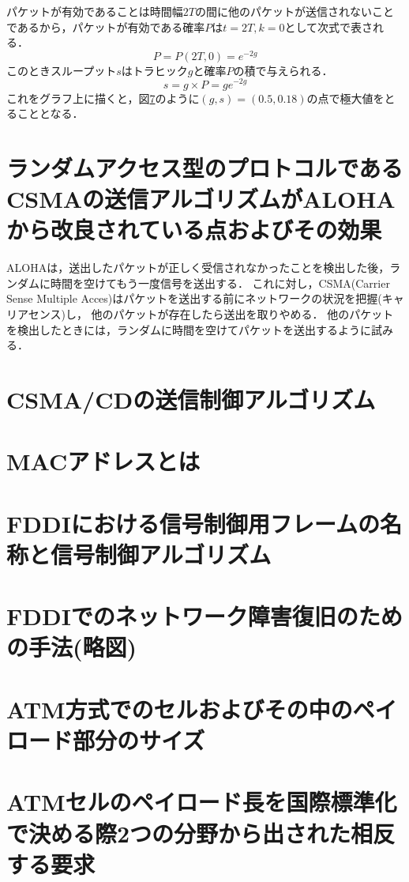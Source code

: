 \documentclass[10.5pt]{jsarticle}
\begin{document}
パケットが有効であることは時間幅$2T$の間に他のパケットが送信されないことであるから，パケットが有効である確率$P$は$t=2T, k=0$として次式で表される．
\[P = P(2T, 0) = e^{-2g}\]
このときスループット$s$はトラヒック$g$と確率$P$の積で与えられる．
\[s = g \times P = ge^{-2g}\]
これをグラフ上に描くと，図\ref{}のように$(g, s) = (0.5, 0.18)$の点で極大値をとることとなる．

\section{ランダムアクセス型のプロトコルであるCSMAの送信アルゴリズムがALOHAから改良されている点およびその効果}
ALOHAは，送出したパケットが正しく受信されなかったことを検出した後，ランダムに時間を空けてもう一度信号を送出する．
これに対し，CSMA(Carrier Sense Multiple Acces)はパケットを送出する前にネットワークの状況を把握(キャリアセンス)し，
他のパケットが存在したら送出を取りやめる．
他のパケットを検出したときには，ランダムに時間を空けてパケットを送出するように試みる．

\section{CSMA/CDの送信制御アルゴリズム}



\section{MACアドレスとは}



\section{FDDIにおける信号制御用フレームの名称と信号制御アルゴリズム}



\section{FDDIでのネットワーク障害復旧のための手法(略図)}



\section{ATM方式でのセルおよびその中のペイロード部分のサイズ}



\section{ATMセルのペイロード長を国際標準化で決める際2つの分野から出された相反する要求}
\end{document}
